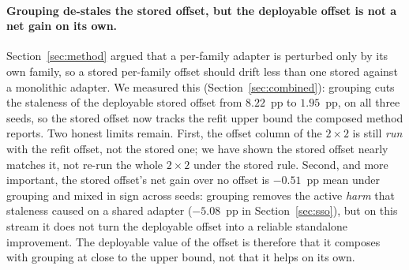 \paragraph{Grouping de-stales the stored offset, but the deployable offset is not a net gain on its own.}
Section~\ref{sec:method} argued that a per-family adapter is perturbed only by its own
family, so a stored per-family offset should drift less than one stored against a
monolithic adapter. We measured this (Section~\ref{sec:combined}): grouping cuts the
staleness of the deployable stored offset from $8.22$~pp to $1.95$~pp, on all three
seeds, so the stored offset now tracks the refit upper bound the composed method reports.
Two honest limits remain. First, the offset column of the $2\times2$ is still \emph{run}
with the refit offset, not the stored one; we have shown the stored offset nearly matches
it, not re-run the whole $2\times2$ under the stored rule. Second, and more important, the
stored offset's net gain over no offset is $-0.51$~pp mean under grouping and mixed in
sign across seeds: grouping removes the active \emph{harm} that staleness caused on a
shared adapter ($-5.08$~pp in Section~\ref{sec:sso}), but on this stream it does not turn
the deployable offset into a reliable standalone improvement. The deployable value of the
offset is therefore that it composes with grouping at close to the upper bound, not that
it helps on its own.